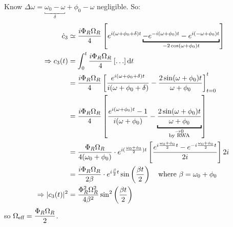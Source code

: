 \begin{parts}
	Know $\Delta\omega = \underbracket{\omega_0 - \omega}_{\delta} + \phi_0 - \omega$ negligible.
	So:
	\begin{align*}
		\dot{c}_3 &\simeq \frac{i\Phi_R \Omega_R}{4} \sbracket{e^{i(\omega + \phi_0 + \delta)t} \underbracket{- e^{-i(\omega + \phi_0)t} - e^{i(-\omega + \phi_0)t}}_{-2\cos (\omega + \phi_0)t}} \\
		\Rightarrow c_3(t) &= \defint{0}{t}{\frac{i\Phi_R \Omega_R}{4}\sbracket{\ldots}}{t} \\
		&= \frac{i\Phi_R \Omega_R}{4} \sbracket{\frac{e^{i(\omega + \phi_0 + \delta)t}}{i(\omega + \phi_0 + \delta)} - \frac{2 \sin (\omega + \phi_0)t}{\omega + \phi_0}}_{t=0}^t \\
		&= \frac{i\Phi_R \Omega_R}{4} \sbracket{\frac{e^{i(\omega + \phi_0)t} - 1}{i(\omega + \phi_0)} - \underbracket{\frac{2 \sin (\omega + \phi_0)t}{\omega + \phi_0}}_{\mathclap{\substack{\to 0 \\ \textnormal{by RWA}}}}} \\
		&= \frac{\Phi_R \Omega_R}{4(\omega_0 + \phi_0)} \cdot e^{i(\frac{\omega_0 + \phi_0}{2})t} \sbracket{\frac{e^{i\frac{\omega_0 + \phi_0}{2}t} - e^{-i\frac{\omega_0 + \phi_0}{2}t}}{2i}} 2i \\
		&= \frac{i\Phi_R \Omega_R}{2\beta} \cdot e^{i\frac{\beta}{2}t} \sin\rbracket{\frac{\beta t}{2}} \mtext{where } \beta = \omega_0 + \phi_0 \\
		\Rightarrow |c_3(t)|^2 &= \frac{\Phi_R^2 \Omega_R^2}{4\beta^2} \sin^2 \rbracket{\frac{\beta t}{2}}
	\end{align*}
	so $\Omega_\textnormal{eff} = \dfrac{\Phi_R \Omega_R}{2}$.
\end{parts}
